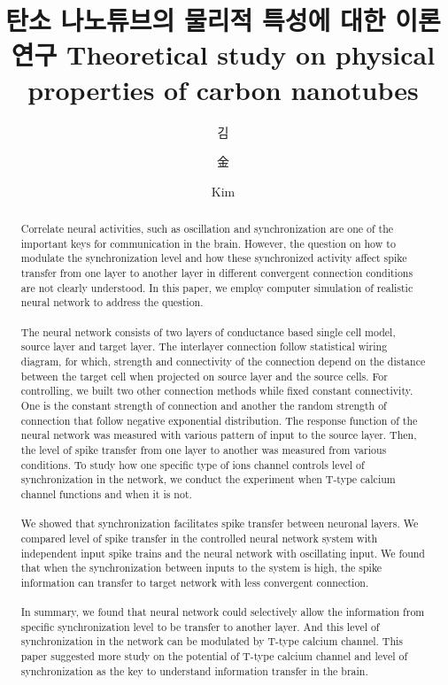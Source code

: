 \documentclass[doctor,english,final]{kaist-ucs}
\title[korean] {탄소 나노튜브의 물리적 특성에 대한 이론 연구}
\title[english]{ Theoretical study on physical properties of
                carbon nanotubes}
\author[korean] {김}{용 현}
\author[chinese]{金}{容 賢}
\author[english]{Kim}{Yong-Hyun}
\begin{document}

    \begin{abstract}
        \paragraph{} Correlate neural activities, such as oscillation and synchronization are one of the important keys for communication in the brain. However, the question on how to modulate the synchronization level and how these synchronized activity affect spike transfer from one layer to another layer in different convergent connection conditions are not clearly understood. In this paper, we employ computer simulation of realistic neural network to address the question. 
         \paragraph{} The neural network consists of two layers of conductance based single cell model, source layer and target layer. The interlayer connection follow statistical wiring diagram, for which, strength and connectivity of the connection depend on the distance between the target cell when projected on source layer and the source cells. For controlling, we built two other connection methods while fixed constant connectivity. One is the constant strength of connection and another the random strength of connection that follow negative exponential distribution. The response function of the neural network was measured with various pattern of input to the source layer. Then, the level of spike transfer from one layer to another was measured from various conditions. To study how one specific type of ions channel controls level of synchronization in the network, we conduct the experiment when T-type calcium channel functions and when it is not.
          \paragraph{} We showed that synchronization facilitates spike transfer between neuronal layers.  We compared level of spike transfer in the controlled neural network system with independent input spike trains and the neural network with oscillating input.  We found that when the synchronization between inputs to the system is high, the spike information can transfer to target network with less convergent connection.
          \paragraph{} In summary, we found that neural network could selectively allow the information from specific synchronization level to be transfer to another layer.  And this level of synchronization in the network can be modulated by T-type calcium channel.  This paper suggested more study on the potential of T-type calcium channel and level of synchronization as the key to understand information transfer in the brain. 
    \end{abstract}
\end{document}
